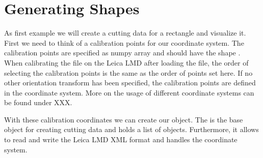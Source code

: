 \documentclass[letterpaper,10pt,english,openany,oneside]{sphinxmanual}
\begin{document}
\section{Generating Shapes}
\label{\detokenize{pages/quickstart:generating-shapes}}
\sphinxAtStartPar
As first example we will create a cutting data for a rectangle and visualize it. First we need to think of a calibration points for our coordinate system.  The calibration points are specified as numpy array and should have the shape . When calibrating the file on the Leica LMD after loading the file, the order of selecting the calibration points is the same as the order of points set here. If no other orientation transform has been specified,  the calibration points are defined in the  coordinate system. More on the usage of different coordinate systems can be found under XXX.

\begin{sphinxVerbatim}[commandchars=\\\{\}]
   
    

  \PYG{p}{[}\PYG{p}{[} \PYG{p}{]}
                        \PYG{p}{[} \PYG{p}{]}
                        \PYG{p}{[} \PYG{p}{]}\PYG{p}{]}
\end{sphinxVerbatim}

\sphinxAtStartPar
With these calibration coordinates we can create our {\hyperref[\detokenize{pages/modules:lmd.lib.Collection}]{}} object. The {\hyperref[\detokenize{pages/modules:lmd.lib.Collection}]{}} is the base object for creating cutting data and holds a list of {\hyperref[\detokenize{pages/modules:lmd.lib.Shape}]{}} objects. Furthermore, it allows to read and write the Leica LMD XML format and handles the coordinate system.

\begin{sphinxVerbatim}[commandchars=\\\{\}]
    
\end{sphinxVerbatim}
\end{document}
